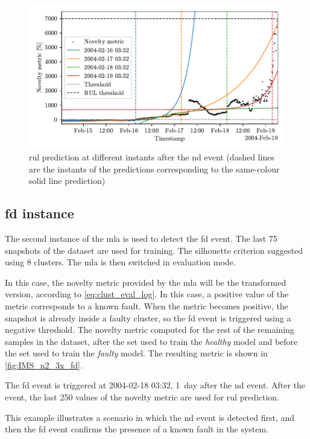 \begin{figure}
    \centering
    \includegraphics[width=\textwidth]{images/IMS/Test02/RUL.pdf}
    \caption{\gls{rul} prediction at different instants after the \gls{nd} event (dashed lines are the instants of the predictions corresponding to the same-colour solid line prediction)}
    \label{fig:IMS_n2_3x_prediction}
\end{figure}

\subsection{\gls{fd} instance}
The second instance of the \gls{mla} is used to detect the \gls{fd} event. The last 75 snapshots of the dataset are used for training. The silhouette criterion suggested using 8 clusters. The \gls{mla} is then switched in evaluation mode. 

In this case, the novelty metric provided by the \gls{mla} will be the transformed version, according to \autoref{eq:clust_eval_log}. In this case, a positive value of the metric corresponds to a known fault. When the metric becomes positive, the snapshot is already inside a faulty cluster, so the \gls{fd} event is triggered using a negative threshold. The novelty metric computed for the rest of the remaining samples in the dataset, after the set used to train the \emph{healthy} model and before the set used to train the \emph{faulty} model. The resulting metric is shown in \autoref{fig:IMS_n2_3x_fd}.

The \gls{fd} event is triggered at 2004-02-18 03:32, 1~day after the \gls{nd} event. After the event, the last 250 values of the novelty metric are used for \gls{rul} prediction. 

This example illustrates a scenario in which the \gls{nd} event is detected first, and then the \gls{fd} event confirms the presence of a known fault in the system.

